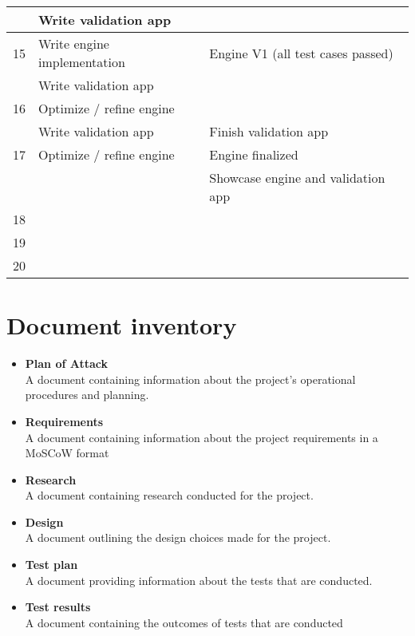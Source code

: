 \documentclass{article} %
\begin{document}
\begin{longtable}{|l|p{}|p{}|}
                         & Write validation app                      &                                         \\ \hline
    15                   & Write engine implementation               & Engine V1 (all test cases passed)       \\ \hline
                         & Write validation app                      &                                         \\ \hline
    16                   & Optimize / refine engine                  &                                         \\ \hline
                         & Write validation app                      & Finish validation app                   \\ \hline
    17                   & Optimize / refine engine                  & Engine finalized                        \\ \hline
                         &                                           & Showcase engine and validation app      \\ \hline
    18                   &                                           &                                         \\ \hline
    19                   &                                           &                                         \\ \hline
    20                   &                                           &                                         \\ \hline
\end{longtable}
\newpage

\section{Document inventory}
\begin{itemize}
    \item \textbf{Plan of Attack}
          \\
          A document containing information about the project's operational procedures and planning.
    \item \textbf{Requirements}
          \\
          A document containing information about the project requirements in a MoSCoW format
    \item \textbf{Research}
          \\
          A document containing research conducted for the project.
    \item \textbf {Design}
          \\
          A document outlining the design choices made for the project.
    \item \textbf {Test plan}
          \\
          A document providing information about the tests that are conducted.
    \item \textbf {Test results}
          \\
          A document containing the outcomes of tests that are conducted
\end{itemize}
\end{document}
